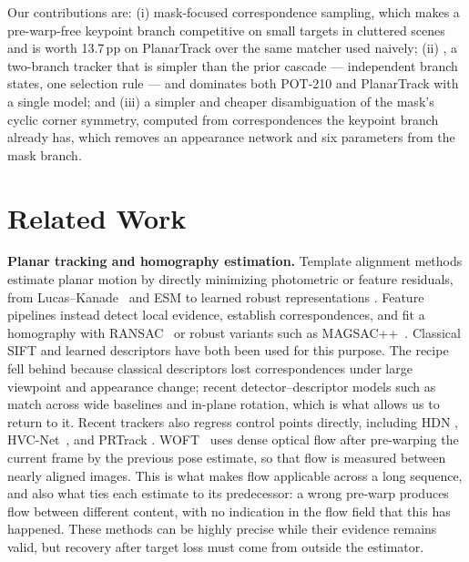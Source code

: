 \documentclass[10pt,twocolumn,letterpaper]{article}
\begin{document}
Our contributions are:
(i) mask-focused correspondence sampling, which makes a pre-warp-free keypoint branch competitive on small targets in cluttered scenes and is worth 13.7\,pp on PlanarTrack over the same matcher used naively;
(ii) \flatsam, a two-branch tracker that is simpler than the prior cascade --- independent branch states, one selection rule --- and dominates both POT-210 and PlanarTrack with a single model; and
(iii) a simpler and cheaper disambiguation of the mask's cyclic corner symmetry, computed from correspondences the keypoint branch already has, which removes an appearance network and six parameters from the mask branch.
\section{Related Work}
\label{sec:related-work}

\noindent\textbf{Planar tracking and homography estimation.}
Template alignment methods estimate planar motion by directly minimizing photometric or feature residuals, from Lucas--Kanade~\cite{lucas1981iterative,baker2004lucas} and ESM \cite{benhimane2004real,benhimane2007homography} to learned robust representations \cite{chen2019learning}.
Feature pipelines instead detect local evidence, establish correspondences, and fit a homography with RANSAC~\cite{fischler1981random} or robust variants such as MAGSAC++~\cite{barath2020magsacpp}.
Classical SIFT \cite{lowe2004distinctive} and learned descriptors have both been used for this purpose.
The recipe fell behind because classical descriptors lost correspondences under large viewpoint and appearance change; recent detector--descriptor models such as \loma~\cite{nordstrom2026loma,nordstrom2026handles} match across wide baselines and in-plane rotation, which is what allows us to return to it.
Recent trackers also regress control points directly, including HDN \cite{zhan2021homography}, HVC-Net~\cite{zhang2022hvcnet}, and PRTrack \cite{zhang2023multiple}.
WOFT~\cite{serych2023planar} uses dense optical flow after pre-warping the current frame by the previous pose estimate, so that flow is measured between nearly aligned images.
This is what makes flow applicable across a long sequence, and also what ties each estimate to its predecessor: a wrong pre-warp produces flow between different content, with no indication in the flow field that this has happened.
These methods can be highly precise while their evidence remains valid, but recovery after target loss must come from outside the estimator.
\end{document}
